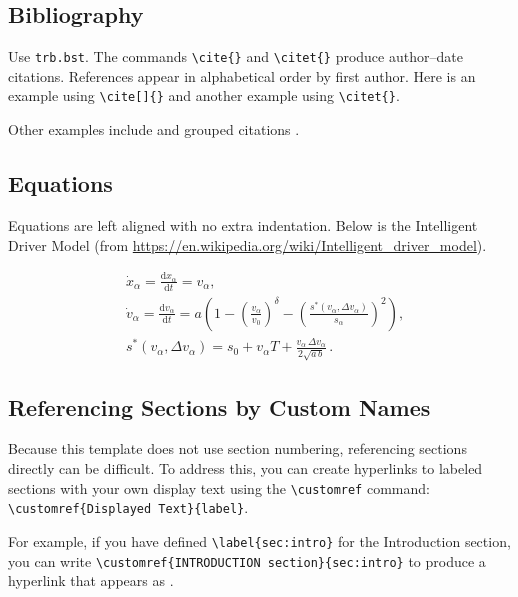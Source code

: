 \documentclass[numbered]{trbunofficial}
\begin{document}
\subsection{Bibliography}
Use \verb|trb.bst|. The commands \verb|\cite{}| and \verb|\citet{}| produce author--date citations. References appear in alphabetical order by first author.  Here is an example using \verb|\cite[]{}| \cite[21-25]{meyer2001} and another example \citet{Garrow2009} using \verb|\citet{}|.

Other examples include \citet{Bierlaire2003,Bierlaire2008,Garrow2009,Koppelman2005} and grouped citations \cite{Bierlaire2003,Garrow2009,Koppelman2005}.

\subsection{Equations}
Equations are left aligned with no extra indentation. Below is the Intelligent Driver Model (from \url{https://en.wikipedia.org/wiki/Intelligent_driver_model}).

\begin{align}
  & \dot{x}_\alpha = \frac{\mathrm{d}x_\alpha}{\mathrm{d}t} = v_\alpha,\\
  & \dot{v}_\alpha = \frac{\mathrm{d}v_\alpha}{\mathrm{d}t}
  = a\!\left( 1 - \left(\frac{v_\alpha}{v_0}\right)^\delta
      - \left(\frac{s^*(v_\alpha,\Delta v_\alpha)}{s_\alpha}\right)^2 \right), \\
  &s^*(v_\alpha,\Delta v_\alpha)
  = s_0 + v_\alpha T + \frac{v_\alpha\,\Delta v_\alpha}{2\sqrt{a\,b}}\,.
\end{align}

\subsection{Referencing Sections by Custom Names}
Because this template does not use section numbering, referencing
sections directly can be difficult. To address this, you can create
hyperlinks to labeled sections with your own display text using the
\verb|\customref| command: \verb|\customref{Displayed Text}{label}|.

For example, if you have defined \verb|\label{sec:intro}| for the
Introduction section, you can write
\verb|\customref{INTRODUCTION section}{sec:intro}|
to produce a hyperlink that appears as
.
\end{document}
